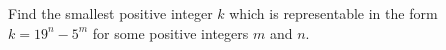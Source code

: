 Find the smallest positive integer $k$ which is representable in the form $k=19^n-5^m$ for some positive integers $m$ and $n$.